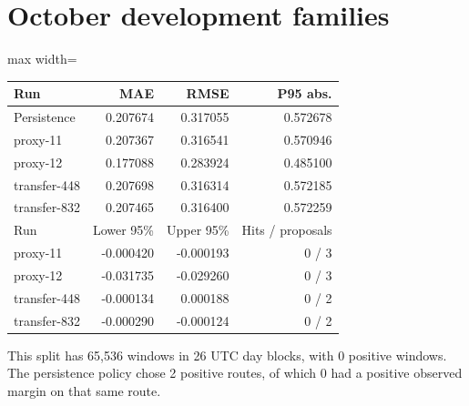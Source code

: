 \documentclass[11pt,oneside,openany]{book}
\begin{document}
\section*{October development families}
\begin{center}\footnotesize\sffamily\setlength{\tabcolsep}{3.5pt}\renewcommand{\arraystretch}{1.2}
\begin{adjustbox}{max width=\linewidth}\begin{tabular}{@{}lrrr@{}}\toprule
Run & MAE & RMSE & P95 abs. \\ \midrule
Persistence & 0.207674 & 0.317055 & 0.572678 \\
proxy-11 & 0.207367 & 0.316541 & 0.570946 \\
proxy-12 & 0.177088 & 0.283924 & 0.485100 \\
transfer-448 & 0.207698 & 0.316314 & 0.572185 \\
transfer-832 & 0.207465 & 0.316400 & 0.572259 \\
Run & Lower 95\% & Upper 95\% & Hits / proposals \\
proxy-11 & -0.000420 & -0.000193 & 0 / 3 \\
proxy-12 & -0.031735 & -0.029260 & 0 / 3 \\
transfer-448 & -0.000134 & 0.000188 & 0 / 2 \\
transfer-832 & -0.000290 & -0.000124 & 0 / 2 \\
\bottomrule\end{tabular}\end{adjustbox}\end{center}
This split has 65,536 windows in 26 UTC day blocks, with 0 positive windows. The persistence policy chose 2 positive routes, of which 0 had a positive observed margin on that same route.
\end{document}
